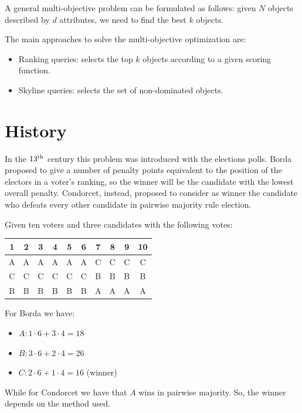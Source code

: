 \documentclass[12pt, a4paper]{report}
\begin{document}
    A general multi-objective problem can be formulated as follows: given $N$ objects described by $d$ attributes, we need to find the best $k$ objects. 
    
    The main approaches to solve the multi-objective optimization are: 
    \begin{itemize}
        \item Ranking queries: selects the top $k$ objects according to a given scoring function.
        \item Skyline queries: selects the set of non-dominated objects. 
    \end{itemize}

    \section{History}
    In the $13^{\textnormal{th}}$ century this problem was introduced with the elections polls. Borda proposed to give a number of penalty points equivalent to the position 
    of the electors in a voter's ranking, so the winner will be the candidate with the lowest overall penalty. Condorcet, instead, proposed to consider as winner the candidate who 
    defeats every other candidate in pairwise majority rule election.
    \begin{example}
        Given ten voters and three candidates with the following votes: 
        \begin{table}[H]
            \centering
            \begin{tabular}{|c|c|c|c|c|c|c|c|c|c|}
            \hline
            1 & 2 & 3 & 4 & 5 & 6 & 7 & 8 & 9 & 10 \\ \hline
            A & A & A & A & A & A & C & C & C & C  \\ 
            C & C & C & C & C & C & B & B & B & B  \\ 
            B & B & B & B & B & B & A & A & A & A  \\ \hline
            \end{tabular}
        \end{table}
        For Borda we have: 
        \begin{itemize}
            \item $A: 1 \cdot 6+3 \cdot 4 = 18$
            \item $B: 3 \cdot 6+2 \cdot 4 = 26$
            \item $C: 2 \cdot 6+1 \cdot 4 = 16$ (winner)
        \end{itemize}
        While for Condorcet we have that $A$ wins in pairwise majority. So, the winner depends on the method used. 
    \end{example}
\end{document}
